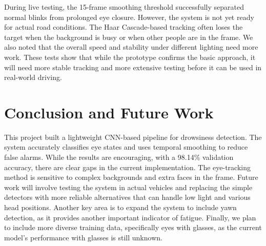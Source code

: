 \documentclass[10pt,twocolumn,letterpaper]{article}
\begin{document}
During live testing, the 15-frame smoothing threshold successfully separated normal blinks from prolonged eye closure. However, the system is not yet ready for actual road conditions. The Haar Cascade-based tracking often loses the target when the background is busy or when other people are in the frame. We also noted that the overall speed and stability under different lighting need more work. These tests show that while the prototype confirms the basic approach, it will need more stable tracking and more extensive testing before it can be used in real-world driving.

\section{Conclusion and Future Work}
This project built a lightweight CNN-based pipeline for drowsiness detection. The system accurately classifies eye states and uses temporal smoothing to reduce false alarms. While the results are encouraging, with a 98.14\% validation accuracy, there are clear gaps in the current implementation. The eye-tracking method is sensitive to complex backgrounds and extra faces in the frame. Future work will involve testing the system in actual vehicles and replacing the simple detectors with more reliable alternatives that can handle low light and various head positions. Another key area is to expand the system to include yawn detection, as it provides another important indicator of fatigue. 
Finally, we plan to include more diverse training data, specifically eyes with glasses, as the current model's performance with glasses is still unknown.

{\small


}
\end{document}
